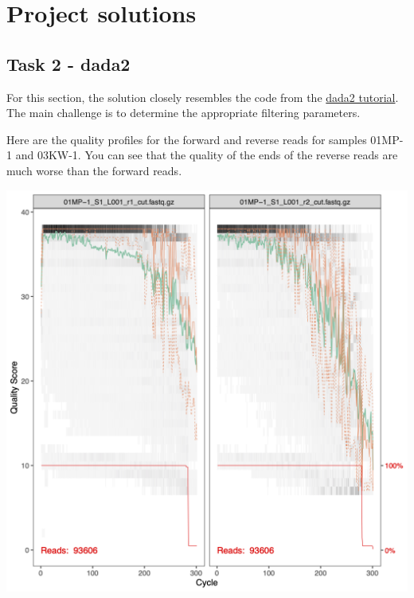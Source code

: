\documentclass[
]{book}
\begin{document}
\hypertarget{project-solutions}{%
\section{Project solutions}\label{project-solutions}}

\hypertarget{task-2---dada2}{%
\subsection{Task 2 - dada2}\label{task-2---dada2}}

For this section, the solution closely resembles the code from the \href{http://benjjneb.github.io/dada2/tutorial.html}{dada2 tutorial}. The main challenge is to determine the appropriate filtering parameters.

Here are the quality profiles for the forward and reverse reads for samples 01MP-1 and 03KW-1. You can see that the quality of the ends of the reverse reads are much worse than the forward reads.

\includegraphics{book/project_files/quality_01MP-1.png}
\end{document}
